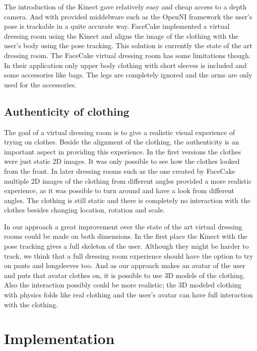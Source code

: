 \documentclass[a4paper]{article}
\begin{document}

The introduction of the Kinect gave relatively easy and cheap access to a depth camera. And with provided middelware such as the OpenNI framework the user's pose is trackable in a quite accurate way. FaceCake implemented a virtual dressing room using the Kinect and aligns the image of the clothing with the user's body using the pose tracking. This solution is currently the state of the art dressing room.
The FaceCake virtual dressing room has some limitations though. In their application only upper body clothing with short sleeves is included and some accessories like bags. The legs are completely ignored and the arms are only used for the accessories.


\subsection{Authenticity of clothing}

The goal of a virtual dressing room is to give a realistic visual experience of trying on clothes. Beside the alignment of the clothing, the authenticity is an important aspect in providing this experience. In the first versions the clothes were just static 2D images. It was only possible to see how the clothes looked from the front. In later dressing rooms such as the one created by FaceCake multiple 2D images of the clothing from different angles provided a more realistic experience, as it was possible to turn around and have a look from different angles. The clothing is still static and there is completely no interaction with the clothes besides changing location, rotation and scale.

In our approach a great improvement over the state of the art virtual dressing rooms could be made on both dimensions. In the first place the Kinect with the pose tracking gives a full skeleton of the user. Although they might be harder to track, we think that a full dressing room experience should have the option to try on pants and longsleeves too. And as our approach makes an avatar of the user and puts that avatar clothes on, it is possible to use 3D models of the clothing. Also the interaction possibly could be more realistic; the 3D modeled clothing with physics folds like real clothing and the user's avatar can have full interaction with the clothing.

\section{Implementation}
\end{document}
